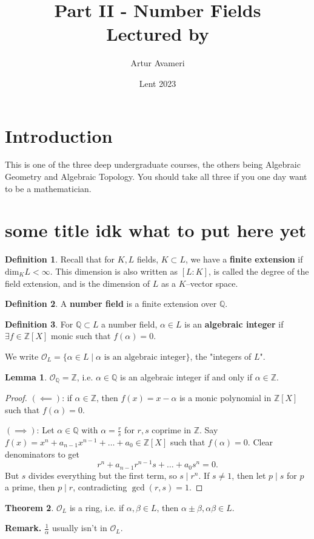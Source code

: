 \documentclass{article}
\title{Part II - Number Fields
    \\ \large
    Lectured by  
}
\author{Artur Avameri}
\date{Lent 2023}
\theoremstyle{definition}
\newtheorem{theorem}{Theorem}[section]
\newtheorem{lemma}[theorem]{Lemma}
\newtheorem{defn}{Definition}[section]
\begin{document}
\maketitle
\tableofcontents
\newpage

\section{Introduction}

This is one of the three deep undergraduate courses, the others being Algebraic Geometry and Algebraic Topology. You should take all three if you one day want to be a mathematician.

\section{some title idk what to put here yet}
\begin{defn}
    Recall that for $K, L$ fields, $K \subset L$, we have a \textbf{finite extension} if $\text{dim}_{K} L < \infty$. This dimension is also written as $[L:K]$, is called the degree of the field extension, and is the dimension of $L$ as a $K$--vector space.
\end{defn}
\begin{defn}
    A \textbf{number field} is a finite extension over $\mathbb{Q}$.
\end{defn}
\begin{defn}
    For $\mathbb{Q} \subset L$ a number field, $\alpha \in L$ is an \textbf{algebraic integer} if $\exists f \in \mathbb{Z}[X]$ monic such that $f(\alpha)=0$. 
    \vspace{1mm}
    
    We write $\mathcal{O}_L = \{\alpha \in L \mid \alpha \text{ is an algebraic integer}\}$, the "integers of $L$".
\end{defn}
\begin{lemma}
    $\mathcal{O}_{\mathbb{Q}} = \mathbb{Z}$, i.e. $\alpha \in \mathbb{Q}$ is an algebraic integer if and only if $\alpha \in \mathbb{Z}$.
\end{lemma}
\begin{proof}
    $(\impliedby)$: if $\alpha \in \mathbb{Z}$, then $f(x)=x-\alpha$ is a monic polynomial in $\mathbb{Z}[X]$ such that $f(\alpha)=0$.
    \vspace{1mm}
    
    $(\implies)$: Let $\alpha \in \mathbb{Q}$ with $\alpha=\frac{r}{s}$ for $r,s$ coprime in $\mathbb{Z}$. Say $f(x)=x^n+a_{n-1}x^{n-1}+\ldots+a_0 \in \mathbb{Z}[X]$ such that $f(\alpha)=0$. Clear denominators to get \[
    r^n + a_{n-1}r^{n-1}s + \ldots + a_0s^n = 0.
    \] 
    But $s$ divides everything but the first term, so $s \mid r^n$. If $s \neq 1$, then let $p \mid s$ for $p$ a prime, then $p \mid r$, contradicting $\gcd(r,s)=1$.
\end{proof}
\begin{theorem}
    $\mathcal{O}_L$ is a ring, i.e. if $\alpha,\beta \in L$, then $\alpha \pm \beta, \alpha \beta \in L$.
\end{theorem}
\textbf{Remark.} $\frac{1}{\alpha}$ usually isn't in $\mathcal{O}_L$.
\vspace{1mm}
\end{document}
